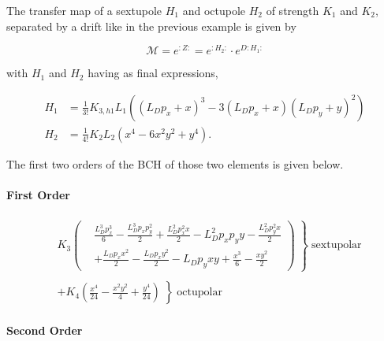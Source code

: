 The transfer map of a sextupole $H_1$ and octupole $H_2$ of strength $K_1$ and $K_2$, separated by
a drift like in the previous example is given by

\begin{equation}
  \mathcal{M} = e^{:Z:} = e^{:H_2:} \cdot e^{D:H_1:}
\end{equation}

with $H_1$ and $H_2$ having as final expressions,

\begin{equation}
  \begin{aligned}
    H_1 &= \frac{1}{3!} K_{3,h1} L_{1} \left(\left(L_{D} p_{x} + x\right)^{3} - 3 \left(L_{D} p_{x} + x\right) \left(L_{D} p_{y} + y\right)^{2}\right) \\
    H_2 &= \frac{1}{4!} K_{2} L_{2} \left(x^{4} - 6 x^{2} y^{2} + y^{4}\right).
  \end{aligned}
\end{equation}

The first two orders of the BCH of those two elements is given below.

\paragraph{First Order}

\footnotesize
\begin{equation}
  \begin{aligned}
    &K_{3} \left. \left(
    \begin{aligned}
      &\frac{L_{D}^{3} p_{x}^{3}}{6} - \frac{L_{D}^{3} p_{x} p_{y}^{2}}{2} + \frac{L_{D}^{2} p_{x}^{2} x}{2} - L_{D}^{2} p_{x} p_{y} y - \frac{L_{D}^{2} p_{y}^{2} x}{2} \\
      &+ \frac{L_{D} p_{x} x^{2}}{2} - \frac{L_{D} p_{x} y^{2}}{2} - L_{D} p_{y} x y + \frac{x^{3}}{6} - \frac{x y^{2}}{2}
    \end{aligned}
    \right) \;\right\} \; \text{sextupolar}\\
    \\[-1.5em]
    &+ K_{4} \left. \left(
      \frac{x^{4}}{24} - \frac{x^{2} y^{2}}{4} + \frac{y^{4}}{24}
    \right) \;\right\} \; \text{octupolar}
  \end{aligned}
\end{equation}
\normalsize


\paragraph{Second Order}

